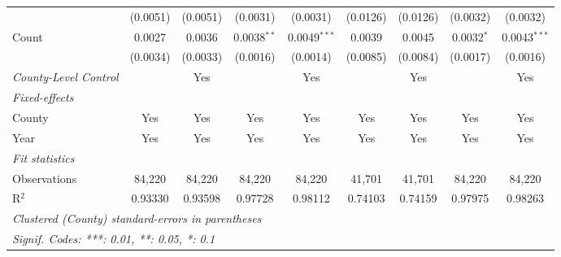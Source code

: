 \documentclass[letterpaper]{article}
\begin{document}
\begin{table}[H]
\begin{tabular}{lcccccccc}
                   & (0.0051)               & (0.0051)               & (0.0031)               & (0.0031)                & (0.0126)     & (0.0126)        & (0.0032)                & (0.0032)\\   
   Count           & 0.0027                 & 0.0036                 & 0.0038$^{**}$          & 0.0049$^{***}$          & 0.0039       & 0.0045          & 0.0032$^{*}$            & 0.0043$^{***}$\\   
                   & (0.0034)               & (0.0033)               & (0.0016)               & (0.0014)                & (0.0085)     & (0.0084)        & (0.0017)                & (0.0016)\\   
   \midrule                
   \emph{County-Level Control }          &                     & Yes                    &                     & Yes                     &           & Yes             &                      & Yes\\ 
   \midrule
   \emph{Fixed-effects}\\
   County          & Yes                    & Yes                    & Yes                    & Yes                     & Yes          & Yes             & Yes                     & Yes\\  
   Year            & Yes                    & Yes                    & Yes                    & Yes                     & Yes          & Yes             & Yes                     & Yes\\  
   \midrule
   \emph{Fit statistics}\\
   Observations    & 84,220                 & 84,220                 & 84,220                 & 84,220                  & 41,701       & 41,701          & 84,220                  & 84,220\\  
   R$^2$           & 0.93330                & 0.93598                & 0.97728                & 0.98112                 & 0.74103      & 0.74159         & 0.97975                 & 0.98263\\  
   \midrule \midrule
   \multicolumn{9}{l}{\emph{Clustered (County) standard-errors in parentheses}}\\
   \multicolumn{9}{l}{\emph{Signif. Codes: ***: 0.01, **: 0.05, *: 0.1}}\\
\end{tabular}
\end{table}

\end{document}
